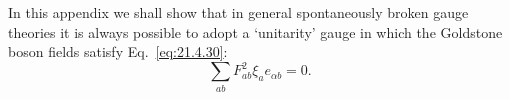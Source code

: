 
\label{app:21.A}

In this appendix we shall show that in general spontaneously broken gauge
theories it is always possible to adopt a `unitarity' gauge in which the
Goldstone boson fields satisfy Eq.~\eqref{eq:21.4.30}:
\begin{equation}
 \sum_{ab}F_{ab}^2\xi_a e_{\alpha b}=0.
 \tag{21.A.1}\label{eq:21.A.1}
\end{equation}

